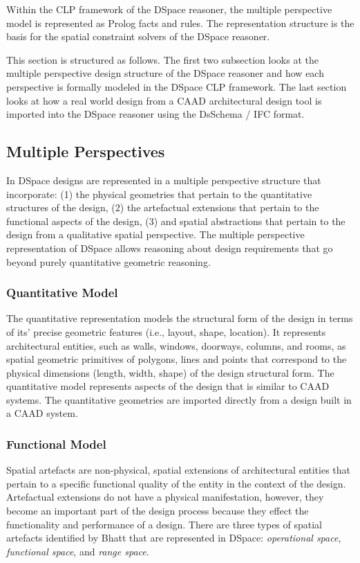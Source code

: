 \documentclass[12pt]{ucthesis}
\begin{document}
Within the CLP framework of the DSpace reasoner, the multiple perspective model is represented as Prolog facts and rules. The representation structure is the basis for the spatial constraint solvers of the DSpace reasoner.

This section is structured as follows. The first two subsection looks at the multiple perspective design structure of the DSpace reasoner and how each perspective is formally modeled in the DSpace CLP framework. The last section looks at how a real world design from a CAAD architectural design tool is imported into the DSpace reasoner using the DsSchema / IFC format.

\subsection{Multiple Perspectives}
In DSpace designs are represented in a multiple perspective structure that incorporate: (1) the physical geometries that pertain to the quantitative structures of the design, (2) the artefactual extensions that pertain to the functional aspects of the design, (3) and spatial abstractions that pertain to the design from a qualitative spatial perspective. The multiple perspective representation of DSpace allows reasoning about design requirements that go beyond purely quantitative geometric reasoning.

\subsubsection{Quantitative Model}
The quantitative representation models the structural form of the design in terms of its' precise geometric features (i.e., layout, shape, location). It represents architectural entities, such as walls, windows, doorways, columns, and rooms, as spatial geometric primitives of polygons, lines and points that correspond to the physical dimensions (length, width, shape) of the design structural form. The quantitative model represents aspects of the design that is similar to CAAD systems. The quantitative geometries are imported directly from a design built in a CAAD system.

\subsubsection{Functional Model}
Spatial artefacts are non-physical, spatial extensions of architectural entities that pertain to a specific functional quality of the entity in the context of the design. Artefactual extensions do not have a physical manifestation, however, they become an important part of the design process because they effect the functionality and performance of a design. There are three types of spatial artefacts identified by Bhatt\cite{Bhatt} that are represented in DSpace: \emph{operational space}, \emph{functional space}, and \emph{range space}.
\end{document}
